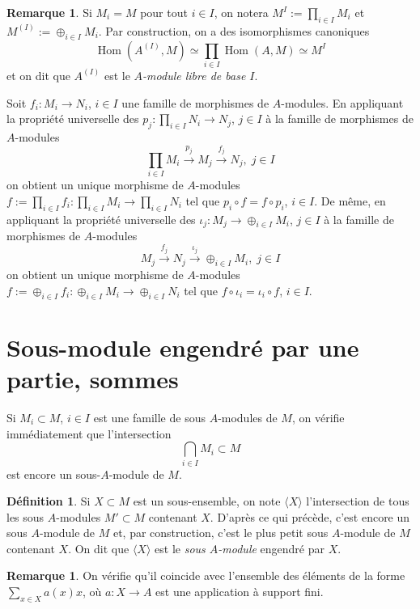 \documentclass[a4paper, oneside, 12pt]{book}
\theoremstyle{theoremeStyle} %
\theoremstyle{definition} %
\newtheorem{definition}[theoreme]{Définition}
\newtheorem{remarque}[theoreme]{Remarque}
\DeclareMathOperator{\SHom}{Hom}
\begin{document}
\begin{remarque}Si $M_{i}=M$ pour tout $i\in I$, on notera $M^{I}:=\prod_{i\in I}M_{i}$ et $M^{(I)}:=\oplus_{i\in I}M_{i}$. Par construction, on a des isomorphismes   canoniques
$$ \SHom(A^{(I)},M)\simeq \prod_{i\in I}\SHom(A,M)\simeq M^{I}$$
et on dit que $A^{(I)}$ est le \textit{$A$-module libre de base $I$}.\end{remarque}


 Soit $f_i:M_i\rightarrow N_i$, $i\in I$ une famille de morphismes de $A$-modules. En appliquant la propriété universelle des $p_j:\prod_{i\in I}N_i\rightarrow N_j$, $j\in I$ à la famille de morphismes de $A$-modules
$$ \prod_{i\in I}M_i\stackrel{p_j}{\rightarrow}M_j\stackrel{f_j}{\rightarrow} N_j,\; j\in I$$
on obtient un unique morphisme de $A$-modules $f:=\prod_{i\in I}f_i:\prod_{i\in I}M_i\rightarrow \prod_{i\in I}N_i$ tel que $p_i\circ f=f\circ p_i$, $i\in I$.   De même,  en appliquant la propriété universelle des $\iota_j:M_j\rightarrow \oplus_{i\in I}M_i$, $j\in I$ à la famille de morphismes de $A$-modules
$$ M_j\stackrel{f_j}{\rightarrow}N_j\stackrel{\iota_j}{\rightarrow} \oplus_{i\in I}M_i,\; j\in I$$
on obtient un unique morphisme de $A$-modules $f:=\oplus_{i\in I}f_i:\oplus_{i\in I}M_i\rightarrow \oplus_{i\in I}N_i$ tel que $  f\circ \iota_i=  \iota_i\circ f$, $i\in I$.

\section{Sous-module engendré par une partie, sommes}  Si $M_{i}\subset M$, $i\in I$ est une famille de sous $A$-modules de $M$, on vérifie immédiatement que l'intersection $$\bigcap_{i\in I}M_{i}\subset M$$ est encore un sous-$A$-module de $M$.\\

\begin{definition}Si $X\subset M$ est un sous-ensemble, on note $\langle X\rangle$ l'intersection de tous les sous $A$-modules $M'\subset M$ contenant $X$. D'après ce qui précède, c'est encore un sous $A$-module de $M$ et, par construction, c'est le plus petit sous $A$-module de $M$ contenant $X$. On dit que $\langle X\rangle$ est le \textit{sous $A$-module} engendré par $X$.\end{definition}

	\begin{remarque}On vérifie qu'il coincide avec l'ensemble des éléments de la forme $\sum_{x\in X}a(x)x$, où $a:X\rightarrow A$ est une application à support fini.
	\end{remarque}
\end{document}
